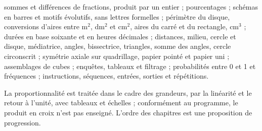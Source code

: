 sommes et différences de fractions, produit par un entier ; pourcentages ;
schémas en barres et motifs évolutifs, sans lettres formelles ;
périmètre du disque, conversions d’aires entre m$^2$, dm$^2$ et cm$^2$,
aires du carré et du rectangle, cm$^3$ ; durées en base soixante et en
heures décimales ; distances, milieu, cercle et disque, médiatrice,
angles, bissectrice, triangles, somme des angles, cercle circonscrit ;
symétrie axiale sur quadrillage, papier pointé et papier uni ; assemblages
de cubes ; enquêtes, tableaux et filtrage ; probabilités entre 0 et 1 et
fréquences ; instructions, séquences, entrées, sorties et répétitions.\par\medskip
La proportionnalité est traitée dans le cadre des grandeurs, par la
linéarité et le retour à l’unité, avec tableaux et échelles ; conformément
au programme, le produit en croix n’est pas enseigné. L’ordre des
chapitres est une proposition de progression.

\clearpage
